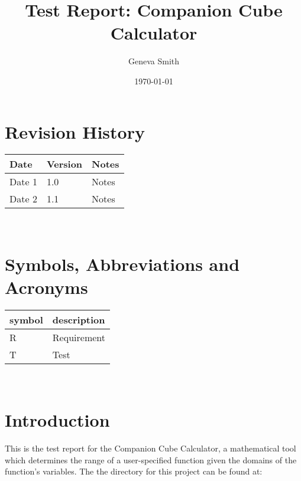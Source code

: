 \documentclass[12pt, titlepage]{article}
\begin{document}
\title{Test Report: Companion Cube Calculator} 
\author{Geneva Smith}
\date{\today}
	
\maketitle


\section{Revision History}

\begin{tabularx}{\textwidth}{p{3cm}p{2cm}X}
\toprule {\bf Date} & {\bf Version} & {\bf Notes}\\
\midrule
Date 1 & 1.0 & Notes\\
Date 2 & 1.1 & Notes\\
\bottomrule
\end{tabularx}

~\newpage

\section{Symbols, Abbreviations and Acronyms}

\renewcommand{\arraystretch}{1.2}
\begin{tabular}{l l} 
  \toprule		
  \textbf{symbol} & \textbf{description}\\
  \midrule 
  R & Requirement \\
  T & Test\\
  \bottomrule
\end{tabular}\\

\newpage

\tableofcontents

\listoftables %

\listoffigures %

\newpage


\section{Introduction}
This is the test report for the Companion Cube Calculator, a mathematical 
tool which determines the range of a user-specified function given the domains 
of the function's variables. The the directory for this project can be found at:
\end{document}
